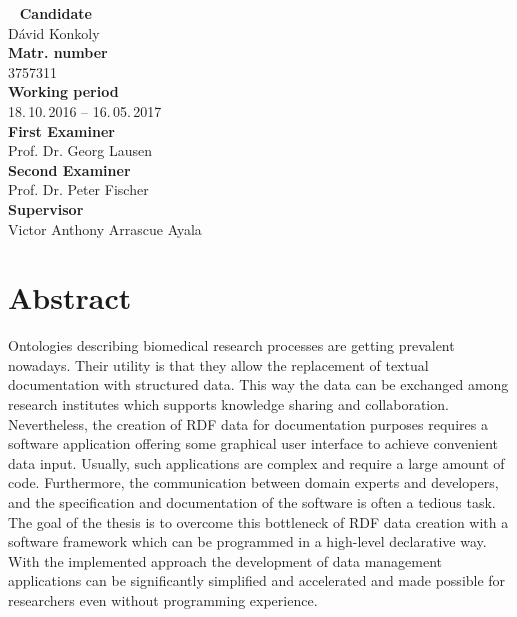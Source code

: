 


%
\newpage
~\vfill
\noindent \textbf{Candidate}\smallskip{}
\\
Dávid Konkoly \smallskip{}
\\
\noindent \textbf{Matr. number}\smallskip{}
\\
3757311 \smallskip{}
\\
\textbf{Working period}\smallskip{}
\\
18.\,10.\,2016 -- 16.\,05.\,2017 \smallskip{}
\\
\textbf{First Examiner}\smallskip{}
\\
Prof. Dr. Georg Lausen\smallskip{}
\\
\textbf{Second Examiner}\smallskip{}
\\
Prof. Dr. Peter Fischer\smallskip{}
\\
\textbf{Supervisor}\smallskip{}
\\
Victor Anthony Arrascue Ayala\\

\newpage
\chapter*{Abstract}


Ontologies describing biomedical research processes are getting prevalent nowadays. Their utility is that they allow the replacement of textual documentation with structured data. This way the data can be exchanged among research institutes which supports knowledge sharing and collaboration. Nevertheless, the creation of RDF data for documentation purposes requires a software application offering some graphical user interface to achieve convenient data input. Usually, such applications are complex and require a large amount of code. Furthermore, the communication between domain experts and developers, and the specification and documentation of the software is often a tedious task. The goal of the thesis is to overcome this bottleneck of RDF data creation with a software framework which can be programmed in a high-level declarative way. With the implemented approach the development of data management applications can be significantly simplified and accelerated and made possible for researchers even without programming experience.


